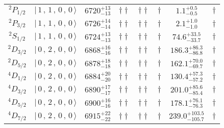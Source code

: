 \begin{tabular}{c| c c c c c c c}
$^{2}P_{1/2}$ & $\vert \,1\,,\,1\,,\,0\,,\,0 \,\rangle $ & $6720^{+13}_{-13}$ & $\dagger\dagger$ & $\dagger\dagger$ & $\dagger$ & $1.1^{+0.5}_{-0.5}$ & $\dagger$ \\ 
$^{2}P_{3/2}$ & $\vert \,1\,,\,1\,,\,0\,,\,0 \,\rangle $ & $6726^{+14}_{-14}$ & $\dagger\dagger$ & $\dagger\dagger$ & $\dagger$ & $2.1^{+1.0}_{-1.0}$ & $\dagger$ \\ 
$^{2}S_{1/2}$ & $\vert \,1\,,\,1\,,\,0\,,\,0 \,\rangle $ & $6724^{+13}_{-13}$ & $\dagger\dagger$ & $\dagger\dagger$ & $\dagger$ & $74.6^{+33.5}_{-33.7}$ & $\dagger$ \\ 
$^{2}D_{3/2}$ & $\vert \,0\,,\,2\,,\,0\,,\,0 \,\rangle $ & $6868^{+16}_{-16}$ & $\dagger\dagger$ & $\dagger\dagger$ & $\dagger$ & $186.3^{+86.3}_{-86.8}$ & $\dagger$ \\ 
$^{2}D_{5/2}$ & $\vert \,0\,,\,2\,,\,0\,,\,0 \,\rangle $ & $6878^{+18}_{-18}$ & $\dagger\dagger$ & $\dagger\dagger$ & $\dagger$ & $162.1^{+70.0}_{-69.7}$ & $\dagger$ \\ 
$^{4}D_{1/2}$ & $\vert \,0\,,\,2\,,\,0\,,\,0 \,\rangle $ & $6884^{+20}_{-20}$ & $\dagger\dagger$ & $\dagger\dagger$ & $\dagger$ & $130.4^{+57.3}_{-57.2}$ & $\dagger$ \\ 
$^{4}D_{3/2}$ & $\vert \,0\,,\,2\,,\,0\,,\,0 \,\rangle $ & $6890^{+17}_{-17}$ & $\dagger\dagger$ & $\dagger\dagger$ & $\dagger$ & $201.0^{+85.6}_{-85.4}$ & $\dagger$ \\ 
$^{4}D_{5/2}$ & $\vert \,0\,,\,2\,,\,0\,,\,0 \,\rangle $ & $6900^{+16}_{-16}$ & $\dagger\dagger$ & $\dagger\dagger$ & $\dagger$ & $178.1^{+76.1}_{-76.3}$ & $\dagger$ \\ 
$^{4}D_{7/2}$ & $\vert \,0\,,\,2\,,\,0\,,\,0 \,\rangle $ & $6915^{+22}_{-22}$ & $\dagger\dagger$ & $\dagger\dagger$ & $\dagger$ & $239.0^{+103.5}_{-105.7}$ & $\dagger$ \\ 
\hline \hline
\end{tabular}

